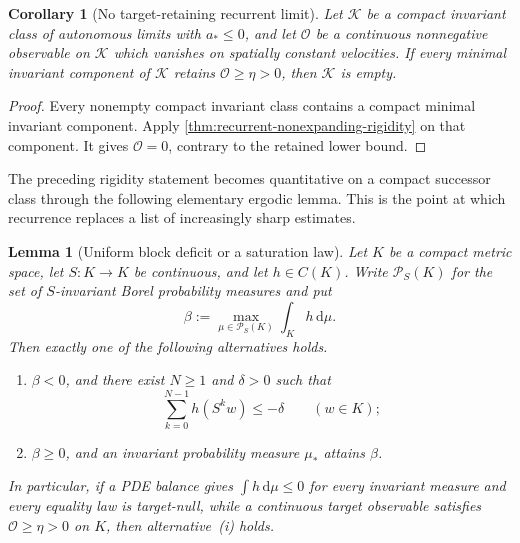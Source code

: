 \documentclass[11pt]{amsart}
\numberwithin{equation}{section}
\theoremstyle{plain}
\newtheorem{lemma}[lemma]{Lemma}
\newtheorem{corollary}[corollary]{Corollary}
\theoremstyle{definition}
\theoremstyle{remark}
\newcommand{\dd}{\,\mathrm d}
\begin{document}
\begin{corollary}[No target-retaining recurrent limit]
\label{cor:no-target-recurrent-nonexpanding-limit}
Let \(\mathcal K\) be a compact invariant class of autonomous limits with
\(a_*\le0\), and let \(\mathcal O\) be a continuous nonnegative observable
on \(\mathcal K\) which vanishes on spatially constant velocities.  If every
minimal invariant component of \(\mathcal K\) retains
\(\mathcal O\ge\eta>0\), then \(\mathcal K\) is empty.
\end{corollary}

\begin{proof}
Every nonempty compact invariant class contains a compact minimal invariant
component.  Apply \cref{thm:recurrent-nonexpanding-rigidity} on that
component.  It gives \(\mathcal O=0\), contrary to the retained lower bound.
\end{proof}

The preceding rigidity statement becomes quantitative on a compact successor
class through the following elementary ergodic lemma.  This is the point at
which recurrence replaces a list of increasingly sharp estimates.

\begin{lemma}[Uniform block deficit or a saturation law]
\label{lem:uniform-block-deficit}
Let \(K\) be a compact metric space, let \(S:K\to K\) be continuous, and
let \(h\in C(K)\).  Write \(\mathcal P_S(K)\) for the set of
\(S\)-invariant Borel probability measures and put
\begin{equation}\label{eq:maximal-invariant-deficit-average}
 \beta:=\max_{\mu\in\mathcal P_S(K)}\int_Kh\dd\mu.
\end{equation}
Then exactly one of the following alternatives holds.
\begin{enumerate}[label=\textup{(\roman*)},leftmargin=2.2em]
\item \(\beta<0\), and there exist \(N\ge1\) and \(\delta>0\) such that
\begin{equation}\label{eq:uniform-negative-block}
 \sum_{k=0}^{N-1}h(S^kw)\le-\delta
 \qquad(w\in K);
\end{equation}
\item \(\beta\ge0\), and an invariant probability measure \(\mu_*\)
attains \(\beta\).
\end{enumerate}
In particular, if a PDE balance gives
\(\int h\dd\mu\le0\) for every invariant measure and every equality law
is target-null, while a continuous target observable satisfies
\(\mathcal O\ge\eta>0\) on \(K\), then alternative~\textup{(i)} holds.
\end{lemma}
\end{document}
